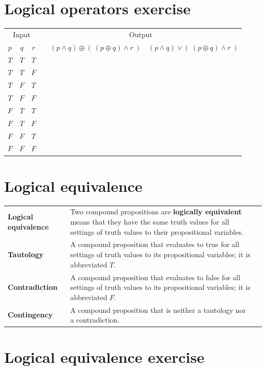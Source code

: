 \documentclass[12pt, oneside]{article}
\begin{document}
\section*{Logical operators exercise}


\begin{center}
    \begin{tabular}{ccc||p{3in}|c|c}
    \multicolumn{3}{c||}{Input}  & \multicolumn{3}{c}{Output} \\
    $p$ & $q$ & $r$  &  &  $(p \land q) \oplus (~ ( p \oplus q) \land r~)$ & $(p \land q) \vee (~ ( p \oplus q) \land r~)$ \\
    \hline
    $T$ & $T$  & $T$ &   && \\
    $T$ & $T$  & $F$ &   && \\
    $T$ & $F$  & $T$ &   && \\
    $T$ & $F$  & $F$ &   && \\
    $F$ & $T$  & $T$ &   && \\
    $F$ & $T$  & $F$ &   && \\
    $F$ & $F$  & $T$ &   && \\
    $F$ & $F$  & $F$ &   && \\
    \end{tabular}
\end{center}
    \vfill \vfill
\section*{Logical equivalence}


\begin{tabular}{lp{4in}p{2in}}
{\bf Logical equivalence } &Two compound  propositions are {\bf logically  equivalent} means that  they 
have the  same  truth  values for all settings of truth  values to their propositional  variables.\\
{\bf Tautology} & A compound proposition that evaluates to true
for all settings of truth  values to its propositional  variables; it is  abbreviated $T$.\\
{\bf Contradiction} & A compound proposition that  evaluates  to  false 
for  all settings of truth  values to its propositional  variables; it  is abbreviated $F$.\\
{\bf Contingency} & A compound proposition that is neither a tautology nor a contradiction.\\
\end{tabular}
 \vfill
\section*{Logical equivalence exercise}
\end{document}
